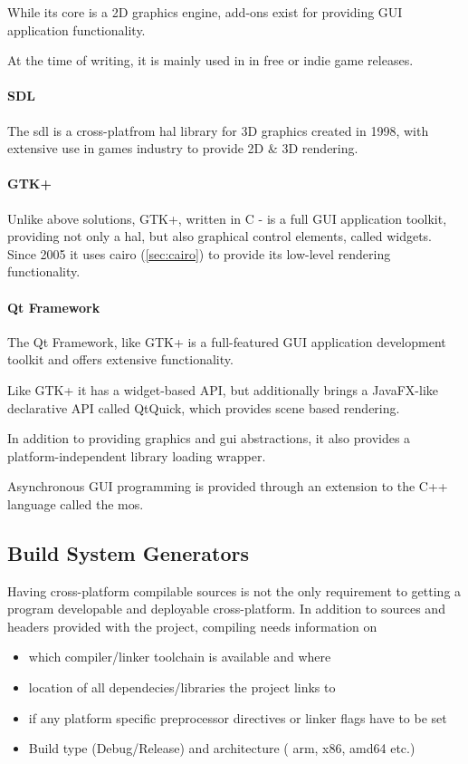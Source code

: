 While its core is a 2D graphics engine, add-ons exist for providing GUI application functionality.  

At the time of writing, it is mainly used in in free or indie game releases.

\paragraph{SDL}
The \gls{sdl} is a cross-platfrom \gls{hal} library for 3D graphics created in 1998, with extensive use in games industry to provide 2D \& 3D rendering.

\paragraph{GTK+}
Unlike above solutions, GTK+, written in C - is a full GUI application toolkit, providing not only a \gls{hal}, but also graphical control elements, called widgets. Since 2005 it uses cairo (\ref{sec:cairo}) to provide its low-level rendering functionality.

\paragraph{Qt Framework}
The Qt Framework, like GTK+ is a full-featured GUI application development toolkit and offers extensive functionality.

Like GTK+ it has a widget-based API, but additionally brings a JavaFX-like declarative API called QtQuick, which provides scene based rendering.

In addition to providing graphics and \gls{gui} abstractions, it also provides a platform-independent library loading wrapper.

Asynchronous GUI programming is provided through an extension to the C++ language called the \gls{mos}.

\subsection{Build System Generators}
\label{sec:resMakefileGen}
Having cross-platform compilable sources is not the only requirement to getting a program developable and deployable cross-platform.
In addition to sources and headers provided with the project, compiling needs information on 
\begin{itemize}
	\item which compiler/linker toolchain is available and where
	\item location of all dependecies/libraries the project links to
	\item if any platform specific preprocessor directives or linker flags have to be set
	\item Build type (Debug/Release) and architecture ( arm, x86, amd64 etc.)
\end{itemize}

